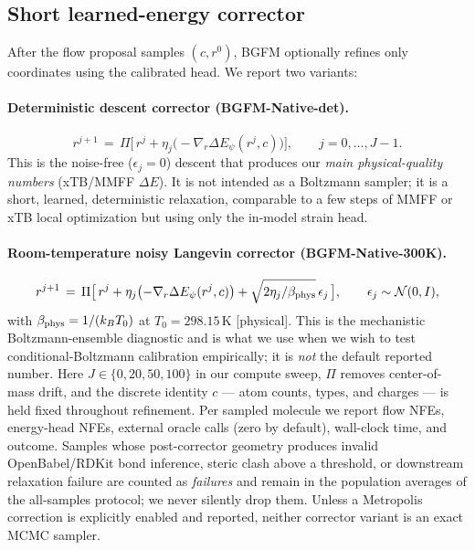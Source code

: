 \documentclass{article}
\begin{document}
\subsection{Short learned-energy corrector}
\label{sec:method:corrector}

After the flow proposal samples $(c, r^0)$, BGFM optionally refines only
coordinates using the calibrated head. We report two variants:

\paragraph{Deterministic descent corrector (BGFM-Native-det).}
\begin{equation}
    r^{j+1} \,=\, \Pi\bigl[\,r^j + \eta_j\bigl(-\nabla_r \Delta E_\psi(r^j, c)\bigr)\bigr],
    \qquad j = 0, \ldots, J-1.
    \label{eq:corrector-det}
\end{equation}
This is the noise-free ($\epsilon_j = 0$) descent that produces our
\emph{main physical-quality numbers} (xTB/MMFF $\Delta E$). It is not
intended as a Boltzmann sampler; it is a short, learned, deterministic
relaxation, comparable to a few steps of MMFF or xTB local optimization
but using only the in-model strain head.

\paragraph{Room-temperature noisy Langevin corrector (BGFM-Native-300K).}
\begin{equation}
    r^{j+1} \,=\, \Pi\bigl[\,r^j + \eta_j\bigl(-\nabla_r \Delta E_\psi(r^j, c)\bigr)
    + \sqrt{2 \eta_j / \beta_{\rm phys}}\,\epsilon_j\,\bigr],
    \qquad \epsilon_j \sim \mathcal{N}(0, I),
    \label{eq:corrector-langevin}
\end{equation}
with $\beta_{\rm phys} = 1/(k_B T_0)$ at $T_0 = 298.15\,\mathrm{K}$ [physical].
This is the mechanistic Boltzmann-ensemble diagnostic and is what we use
when we wish to test conditional-Boltzmann calibration empirically;
it is \emph{not} the default reported number.
Here $J \in \{0, 20, 50, 100\}$ in our compute sweep, $\Pi$ removes
center-of-mass drift, and the discrete identity $c$ --- atom counts,
types, and charges --- is held fixed throughout refinement. Per sampled
molecule we report flow NFEs, energy-head NFEs, external oracle calls
(zero by default), wall-clock time, and outcome. Samples whose
post-corrector geometry produces invalid OpenBabel/RDKit bond inference,
steric clash above a threshold, or downstream relaxation failure are
counted as \emph{failures} and remain in the population averages of
the all-samples protocol; we never silently drop them. Unless a
Metropolis correction is explicitly enabled and reported, neither
corrector variant is an exact MCMC sampler.
\end{document}

